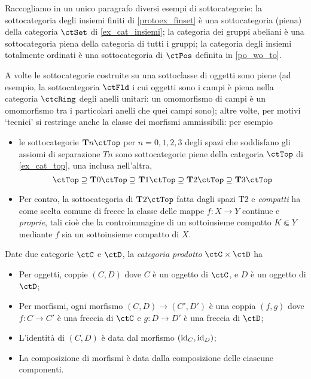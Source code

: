 \begin{example}
	Raccogliamo in un unico paragrafo diversi esempi di sottocategorie: la sottocategoria degli insiemi finiti di \ref{protoex_finset} è una sottocategoria (piena) della categoria \(\ctSet\) di \ref{ex_cat_insiemi}; la categoria dei gruppi abeliani è una sottocategoria piena della categoria di tutti i gruppi; la categoria degli insiemi totalmente ordinati è una sottocategoria di \(\ctPos\) definita in \ref{po_wo_to}.

	A volte le sottocategorie costruite su una sottoclasse di oggetti sono piene (ad esempio, la sottocategoria \(\ctFld\) i cui oggetti sono i campi è piena nella categoria \(\ctcRing\) degli anelli unitari: un omomorfismo di campi è un omomorfismo tra i particolari anelli che quei campi sono); altre volte, per motivi `tecnici' si restringe anche la classe dei morfismi ammissibili: per esempio
	\begin{itemize}
		\item le sottocategorie \(\cate{T}n\ctTop\) per \(n=0,1,2,3\) degli spazi che soddisfano gli assiomi di separazione \(Tn\) sono sottocategorie piene della categoria \(\ctTop\) di \ref{ex_cat_top}, una inclusa nell'altra,
		      \[\ctTop\supseteq\cate{T}0\ctTop\supseteq\cate{T}1\ctTop\supseteq\cate{T}2\ctTop\supseteq\cate{T}3\ctTop\]
		\item Per contro, la sottocategoria di \(\cate{T}2\ctTop\) fatta dagli spazi T2 e \emph{compatti} ha come scelta comune di frecce la classe delle mappe \(f : X\to Y\) continue e \emph{proprie}, tali cioè che la controimmagine di un sottoinsieme compatto \(K\Subset Y\) mediante \(f\) sia un sottoinsieme compatto di \(X\).
	\end{itemize}
\end{example}
\begin{definition}\label{def_cat_prodotto}
	Date due categorie \(\ctC\) e \(\ctD\), la \emph{categoria prodotto} \(\ctC\times\ctD\) ha
	\begin{itemize}
		\item Per oggetti, coppie \((C,D)\) dove \(C\) è un oggetto di \(\ctC\), e \(D\) è un oggetto di \(\ctD\);
		\item Per morfismi, ogni morfismo \((C,D)\to(C',D')\) è una coppia \((f,g)\) dove \(f:C\to C'\) è una freccia di \(\ctC\) e \(g:D\to D'\) è una freccia di \(\ctD\);
		\item L'identità di \((C,D)\) è data dal morfismo \((\mathrm{id}_C,\mathrm{id}_D)\);
		\item La composizione di morfismi è data dalla composizione delle ciascune componenti.
	\end{itemize}
\end{definition}
